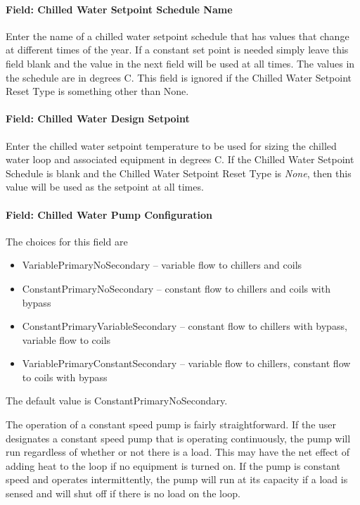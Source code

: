 \paragraph{Field: Chilled Water Setpoint Schedule Name}\label{field-chilled-water-setpoint-schedule-name}

Enter the name of a chilled water setpoint schedule that has values that change at different times of the year. If a constant set point is needed simply leave this field blank and the value in the next field will be used at all times. The values in the schedule are in degrees C. This field is ignored if the Chilled Water Setpoint Reset Type is something other than None.

\paragraph{Field: Chilled Water Design Setpoint}\label{field-chilled-water-design-setpoint}

Enter the chilled water setpoint temperature to be used for sizing the chilled water loop and associated equipment in degrees C. If the Chilled Water Setpoint Schedule is blank and the Chilled Water Setpoint Reset Type is \emph{None}, then this value will be used as the setpoint at all times.

\paragraph{Field: Chilled Water Pump Configuration}\label{field-chilled-water-pump-configuration}

The choices for this field are

\begin{itemize}
\item
  VariablePrimaryNoSecondary -- variable flow to chillers and coils
\item
  ConstantPrimaryNoSecondary -- constant flow to chillers and coils with bypass
\item
  ConstantPrimaryVariableSecondary -- constant flow to chillers with bypass, variable flow to coils
\item
  VariablePrimaryConstantSecondary -- variable flow to chillers, constant flow to coils with bypass
\end{itemize}

The default value is ConstantPrimaryNoSecondary.

The operation of a constant speed pump is fairly straightforward. If the user designates a constant speed pump that is operating continuously, the pump will run regardless of whether or not there is a load. This may have the net effect of adding heat to the loop if no equipment is turned on. If the pump is constant speed and operates intermittently, the pump will run at its capacity if a load is sensed and will shut off if there is no load on the loop.

